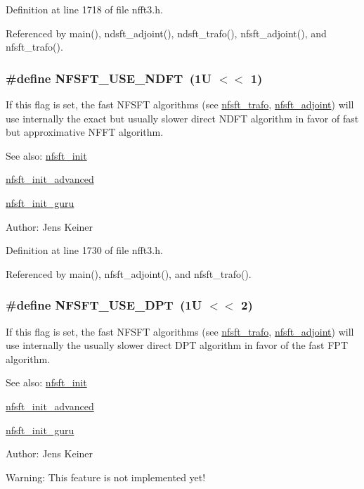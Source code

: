 Definition at line 1718 of file nfft3.h.

Referenced by main(), ndsft\_\-adjoint(), ndsft\_\-trafo(), nfsft\_\-adjoint(), and nfsft\_\-trafo().\hypertarget{group__nfsft_ga26}{
\subsubsection[NFSFT\_\-USE\_\-NDFT]{\setlength{\rightskip}{0pt plus 5cm}\#define NFSFT\_\-USE\_\-NDFT~(1U $<$$<$ 1)}}
\label{group__nfsft_ga26}


If this flag is set, the fast NFSFT algorithms (see \hyperlink{group__nfsft_ga8}{nfsft\_\-trafo}, \hyperlink{group__nfsft_ga9}{nfsft\_\-adjoint}) will use internally the exact but usually slower direct NDFT algorithm in favor of fast but approximative NFFT algorithm. 

\begin{Desc}
\item[See also:]\hyperlink{group__nfsft_ga1}{nfsft\_\-init} 

\hyperlink{group__nfsft_ga2}{nfsft\_\-init\_\-advanced} 

\hyperlink{group__nfsft_ga3}{nfsft\_\-init\_\-guru} \end{Desc}
\begin{Desc}
\item[Author:]Jens Keiner \end{Desc}


Definition at line 1730 of file nfft3.h.

Referenced by main(), nfsft\_\-adjoint(), and nfsft\_\-trafo().\hypertarget{group__nfsft_ga27}{
\subsubsection[NFSFT\_\-USE\_\-DPT]{\setlength{\rightskip}{0pt plus 5cm}\#define NFSFT\_\-USE\_\-DPT~(1U $<$$<$ 2)}}
\label{group__nfsft_ga27}


If this flag is set, the fast NFSFT algorithms (see \hyperlink{group__nfsft_ga8}{nfsft\_\-trafo}, \hyperlink{group__nfsft_ga9}{nfsft\_\-adjoint}) will use internally the usually slower direct DPT algorithm in favor of the fast FPT algorithm. 

\begin{Desc}
\item[See also:]\hyperlink{group__nfsft_ga1}{nfsft\_\-init} 

\hyperlink{group__nfsft_ga2}{nfsft\_\-init\_\-advanced} 

\hyperlink{group__nfsft_ga3}{nfsft\_\-init\_\-guru} \end{Desc}
\begin{Desc}
\item[Author:]Jens Keiner \end{Desc}
\begin{Desc}
\item[Warning:]This feature is not implemented yet! \end{Desc}


